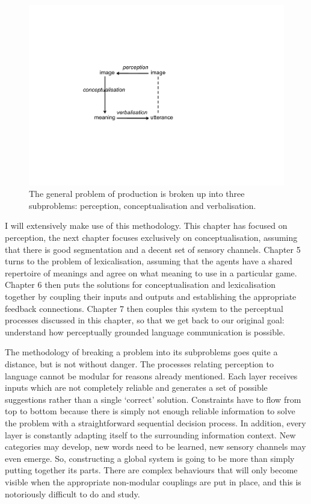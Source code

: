 \begin{figure}[htbp]
  \centerline{\includegraphics[width=.50\textwidth]{chap3/figs/square}}
\caption{\label{square} The general problem of 
production is broken up into three subproblems: perception, 
conceptualisation and verbalisation.}
\end{figure}

I will extensively make use of this methodology. 
This chapter has focused on perception, the next chapter focuses
exclusively on
conceptualisation, assuming that there is good segmentation and a 
decent set of sensory channels. Chapter 5 turns to the 
problem of lexicalisation, assuming that 
the agents have a shared repertoire of meanings and agree on 
what meaning to use in a particular game. Chapter 6 then puts the solutions 
for conceptualisation and lexicalisation together by coupling their
inputs and outputs and establishing the appropriate feedback connections. 
Chapter 7 then couples this system to the perceptual processes discussed
in this chapter, so that we get back to our 
original goal: understand how perceptually grounded language communication 
is possible. 

The methodology of breaking a problem into its subproblems goes quite 
a distance, but is not without danger. The processes relating
perception to language cannot be modular for reasons already mentioned. 
Each layer receives inputs which are not completely reliable and 
generates a set of possible suggestions rather than a single
`correct' solution. Constraints have to flow
from top to bottom because there is simply not enough reliable 
information to solve the problem with a straightforward sequential 
decision process. In addition, every layer is constantly adapting 
itself to the surrounding information context. New categories 
may develop, new words need to be learned, new sensory 
channels may even emerge. So, constructing a global system is going 
to be more than simply putting together its parts. There are complex
behaviours that will only become visible when the appropriate non-modular
couplings are put in place, and this is notoriously difficult to 
do and study. 

